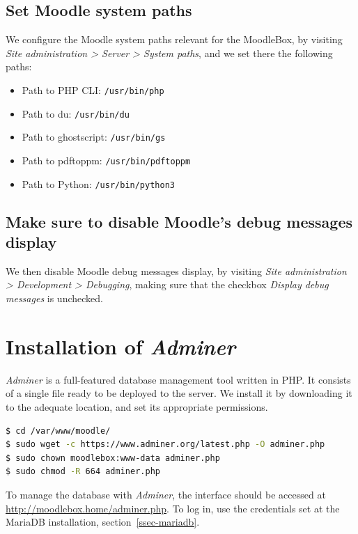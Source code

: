 \documentclass[12pt]{article}
\begin{document}
\subsection{Set Moodle system paths}

We configure the Moodle system paths relevant for the MoodleBox, by visiting \emph{Site administration > Server > System paths}, and we set there the following paths:
\begin{itemize}
\item Path to PHP CLI: \texttt{/usr/bin/php}
\item Path to du: \texttt{/usr/bin/du}
\item Path to ghostscript: \texttt{/usr/bin/gs}
\item Path to pdftoppm: \texttt{/usr/bin/pdftoppm}
\item Path to Python: \texttt{/usr/bin/python3}
\end{itemize}

\subsection{Make sure to disable Moodle's debug messages display}

We then disable Moodle debug messages display, by visiting \emph{Site administration > Development > Debugging}, making sure that the checkbox \emph{Display debug messages} is unchecked. 

\section{Installation of \textsl{Adminer}}

\textsl{Adminer} is a full-featured database management tool written in PHP.
It consists of a single file ready to be deployed to the server.
We install it by downloading it to the adequate location, and set its appropriate permissions.
\begin{lstlisting}[language=bash]
$ cd /var/www/moodle/
$ sudo wget -c https://www.adminer.org/latest.php -O adminer.php
$ sudo chown moodlebox:www-data adminer.php
$ sudo chmod -R 664 adminer.php
\end{lstlisting}

To manage the database with \textsl{Adminer}, the interface should be accessed at \url{http://moodlebox.home/adminer.php}.
To log in, use the credentials set at the MariaDB installation, section~\ref{ssec-mariadb}.

\end{document}
